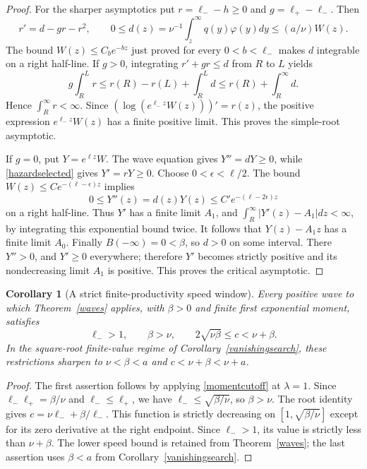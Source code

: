 \documentclass[11pt]{article}
\newtheorem{corollary}[theorem]{Corollary}
\begin{document}
\begin{proof}
For the sharper asymptotics put $r=\ell_--h\geq0$ and
$g=\ell_+-\ell_-$. Then
\[
 r'=d-gr-r^2,\qquad
 0\leq d(z)=\nu^{-1}\int_z^\infty q(y)\varphi(y)dy
                 \leq(a/\nu)W(z).
\]
The bound $W(z)\leq C_b e^{-bz}$ just proved for every
$0<b<\ell_-$ makes $d$ integrable on a right half-line.
If $g>0$, integrating $r'+gr\leq d$ from $R$ to $L$ yields
\[
 g\int_R^L r\leq r(R)-r(L)+\int_R^L d
                          \leq r(R)+\int_R^\infty d.
\]
Hence $\int_R^\infty r<\infty$. Since
$(\log(e^{\ell_-z}W(z)))'=r(z)$, the positive expression
$e^{\ell_-z}W(z)$ has a finite positive limit. This proves the
simple-root asymptotic.

If $g=0$, put $Y=e^{\ell z}W$. The wave equation gives
$Y''=dY\geq0$, while \eqref{hazardselected} gives $Y'=rY\geq0$.
Choose $0<\epsilon<\ell/2$. The bound
$W(z)\leq C e^{-(\ell-\epsilon)z}$ implies
\[
 0\leq Y''(z)=d(z)Y(z)
 \leq C' e^{-(\ell-2\epsilon)z}
\]
on a right half-line. Thus $Y'$ has a finite limit $A_1$, and
$\int_R^\infty|Y'(z)-A_1|dz<\infty$, by integrating this exponential
bound twice. It follows that $Y(z)-A_1z$ has a finite limit $A_0$.
Finally $B(-\infty)=0<\beta$, so $d>0$ on some interval.
There $Y''>0$, and $Y'\geq0$ everywhere; therefore $Y'$ becomes
strictly positive and its nondecreasing limit $A_1$ is positive.
This proves the critical asymptotic.
\end{proof}

\begin{corollary}[A strict finite-productivity speed window]
\label{strictspeed}
Every positive wave to which Theorem~\ref{waves} applies, with
$\beta>0$ and finite first exponential moment, satisfies
\[
 \ell_->1,\qquad \beta>\nu,\qquad
 2\sqrt{\nu\beta}\leq c<\nu+\beta.
\]
In the square-root finite-value regime of Corollary~\ref{vanishingsearch},
these restrictions sharpen to
$\nu<\beta<a$ and $c<\nu+\beta<\nu+a$.
\end{corollary}
\begin{proof}
The first assertion follows by applying \eqref{momentcutoff} at
$\lambda=1$. Since $\ell_-\ell_+=\beta/\nu$ and
$\ell_-\leq\ell_+$, we have $\ell_-\leq\sqrt{\beta/\nu}$,
so $\beta>\nu$. The root identity gives
$c=\nu\ell_-+\beta/\ell_-$. This function is strictly decreasing
on $[1,\sqrt{\beta/\nu}]$ except for its zero derivative at the
right endpoint. Since $\ell_->1$, its value is strictly less than
$\nu+\beta$. The lower speed bound is retained from
Theorem~\ref{waves}; the last assertion uses $\beta<a$ from
Corollary~\ref{vanishingsearch}.
\end{proof}
\end{document}
